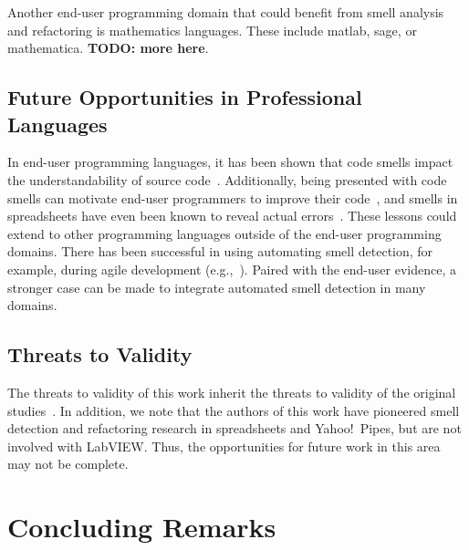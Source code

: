 \documentclass[10pt,conference,compsocconf]{IEEEtran}
\newcommand{\todo}[1]{\textbf{TODO: #1}}
\begin{document}
Another end-user programming domain that could benefit from smell analysis and refactoring is mathematics languages. These include matlab, sage, or mathematica. \todo{more here}.  


\subsection{Future Opportunities in Professional Languages}
In end-user programming languages, it has been shown that code smells impact the understandability of
source code~\cite{StoleeTSE2013}. Additionally, being presented with code smells can motivate end-user programmers to improve their code~\cite{chambers2013smell}, and smells in spreadsheets have even been known to reveal actual errors~\cite{Hermans2012intra}. These lessons could extend to other programming languages outside of the end-user programming domains. There has been successful in using automating smell detection, for example, during agile development (e.g.,~\cite{Schumacher:2010:BES:1852786.1852797}). Paired with the end-user evidence, a stronger case can be made to integrate automated smell detection in many domains. 


\subsection{Threats to Validity}
The threats to validity of this work inherit the threats to validity of the original studies~\cite{Stolee2015, Stolee2011, StoleeTSE2013, Hermans2011, Hermans2012intra, Hermans2012inter, hermans2014bumblebee, chambers2013smell, chambers2015impact, badame2012refactoring}. In addition, we note that the authors of this work have pioneered smell detection and refactoring research in spreadsheets and Yahoo!\ Pipes, but are not involved with LabVIEW. Thus, the opportunities for future work in this area may not be complete.  

\section{Concluding Remarks}
\label{sec:conclusions}

\newpage
\balance





\end{document}
